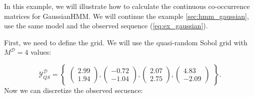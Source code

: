 \documentclass[shortabstract]{iithesis}
\begin{document}
In this example, we will illustrate how to calculate the continuous co-occurrence matrices for GaussianHMM. We will continue the example \ref{sec:hmm_gaussian}, use the same model and the observed sequence (\ref{eq:ex_gaussian}).

First, we need to define the grid. We will use the quasi-random Sobol grid with $M^{\mathcal D} = 4$ values:

\begin{equation*}
    \mathcal Y ^{\mathcal D}_{QS} = \left\{ 
    \begin{array}{c}
        \left( \begin{array}{c}
        2.99\\1.94
        \end{array} \right),
        \left( \begin{array}{c}
        -0.72\\-1.04
        \end{array} \right),
        \left( \begin{array}{c}
        2.07\\2.75
        \end{array} \right),
        \left( \begin{array}{c}
        4.83\\-2.09
        \end{array} \right)
        \end{array} \right\}\text{.}
\end{equation*}
Now we can discretize the observed secuence:
\end{document}
